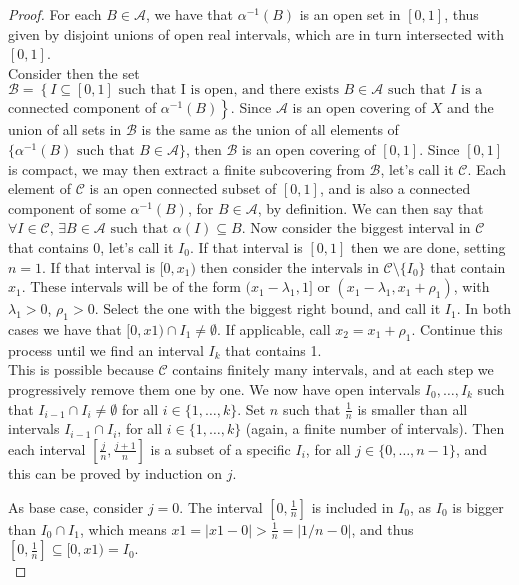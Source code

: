 \documentclass[12pt,a4paper]{article}
\begin{document}
\begin{proof}
For each $B \in \mathcal{A}$, we have that $\alpha^{-1}(B)$ is an open set in $[0,1]$, thus given by disjoint unions of open real intervals, which are in turn intersected with $[0,1]$.\\ 
Consider then the set $\mathcal{B} = \left\{I \subseteq [0,1] \text{ such that I is open, and there exists } B \in \mathcal{A} \text{ such that } I \text{ is a}\right.$ connected component of $\left.\alpha^{-1}(B)\right\}$. Since $\mathcal{A}$ is an open covering of $X$
and the union of all sets in $\mathcal{B}$ is the same as the union of all elements of $\{\alpha^{-1}(B) \text{ such that } B \in \mathcal{A}\}$, then $\mathcal{B}$ is an open covering of $[0,1]$. Since $[0,1]$ is compact, we may then extract
a finite subcovering from $\mathcal{B}$, let's call it $\mathcal{C}$. Each element of $\mathcal{C}$ is an open connected subset of $[0,1]$, and is also a connected component of some $\alpha^{-1}(B)$, for $B \in \mathcal{A}$, by definition.
We can then say that $\forall I \in \mathcal{C},\, \exists B \in \mathcal{A} \text{ such that }\alpha(I) \subseteq B$. Now consider the biggest interval in $\mathcal{C}$ that contains 0, let's call it $I_0$. If that interval is $[0,1]$ then we are done,
setting $n = 1$. If that interval is $[0,x_1)$ then consider the intervals in $\mathcal{C}\setminus \{I_0\}$ that contain $x_1$. These intervals will be of the form $(x_1-\lambda_1,1]$ or $(x_1-\lambda_1, x_1+\rho_1)$, with $\lambda_1 > 0$, $\rho_1 > 0$. Select the one with the biggest right bound, and call it $I_1$. In both cases we have that $[0,x1) \cap I_1 \neq \emptyset$. If applicable, call $x_2 = x_1+\rho_1$. Continue this process until we find an interval $I_k$ that contains 1.\\ 
This is possible because $\mathcal{C}$ contains finitely many intervals, and at each step we progressively remove them one by one. We now have open intervals $I_0,\ldots,I_k$ such that $I_{i-1} \cap I_{i} \neq \emptyset$ for all $i \in \{1,\ldots,k\}$. Set $n$ such that $\frac{1}{n}$ is smaller than all intervals $I_{i-1} \cap I_i$, for all $i \in \{1,\ldots,k\}$ (again, a finite number of intervals). Then each interval $[\frac{j}{n}, \frac{j+1}{n}]$ is a subset of a specific $I_i$, 
for all $j \in \{0,\ldots,n-1\}$, and this can be proved by induction on $j$.

As base case, consider $j=0$.
The interval $[0, \frac{1}{n}]$ is included in $I_0$, as $I_0$ is bigger than $I_0 \cap I_1$, which means $x1 = |x1 - 0| > \frac{1}{n} = |1/n - 0|$, and thus $[0,\frac{1}{n}] \subseteq [0,x1) = I_0$.\\


\end{proof}
\end{document}

